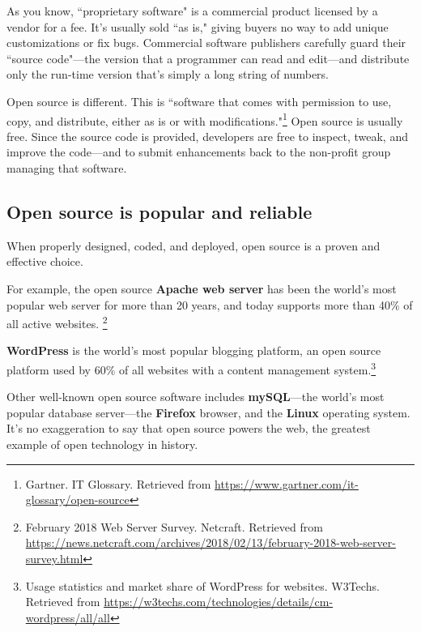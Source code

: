 As you know, ``proprietary software" is a commercial product licensed by a vendor for a fee. It's usually sold ``as is," giving buyers no way to add unique customizations or fix bugs. Commercial  software publishers carefully guard their ``source code"---the version that a programmer can read and edit---and distribute only the run-time version that's simply a long string of numbers. 

Open source is different. This is ``software that comes with permission to use, copy, and distribute, either as is or with modifications."\footnote{ Gartner. IT Glossary. Retrieved from \url{https://www.gartner.com/it-glossary/open-source}} Open source is usually free. Since the source code is  provided, developers are free to inspect, tweak, and improve the code---and to submit enhancements back to the non-profit group managing that software. 

\subsection{Open source is popular and reliable}
When properly designed, coded, and deployed, open source is a proven and effective choice. 

For example, the open source \textbf{Apache web server} has been the world's most popular web server for more than 20 years, and today supports more than 40\% of all active websites. \footnote{ February 2018 Web Server Survey. Netcraft. Retrieved from \url{https://news.netcraft.com/archives/2018/02/13/february-2018-web-server-survey.html}} 

\textbf{WordPress} is the world's most popular blogging platform, an open source platform used by 60\% of all websites with a content management system.\footnote{ Usage statistics and market share of WordPress for websites. W3Techs. Retrieved from \url{https://w3techs.com/technologies/details/cm-wordpress/all/all}} 

Other well-known open source software includes \textbf{mySQL}---the world's most popular database server---the \textbf{Firefox} browser, and the \textbf{Linux} operating system. 
It's no exaggeration to say that open source powers the web, the greatest example of open technology in history. 

